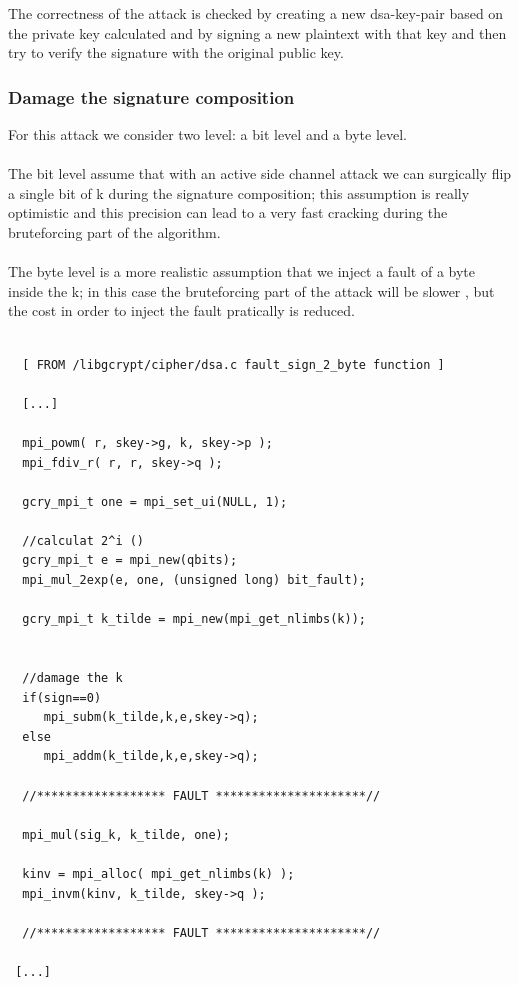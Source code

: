 \documentclass[11pt,english]{article}
\begin{document}
The correctness of the attack is checked by creating a new dsa-key-pair based on the private key calculated and by signing a new plaintext with that key and then try to verify the signature with the original public key.


\subsubsection{Damage the signature composition}

For this attack we consider two level: a bit level and a byte level.\\\\ The bit level assume that with an active side channel attack we can surgically flip a single bit of k during the signature composition; this assumption is really optimistic and this precision can lead to a very fast cracking during the bruteforcing part of the algorithm.\\\\ The byte level is a more realistic assumption that we inject a fault of a byte inside the k; in this case the bruteforcing part of the attack will be slower , but the cost in order to inject the fault pratically is reduced.


\begin{lstlisting}
 
  [ FROM /libgcrypt/cipher/dsa.c fault_sign_2_byte function ]

  [...]
  
  mpi_powm( r, skey->g, k, skey->p );
  mpi_fdiv_r( r, r, skey->q );

  gcry_mpi_t one = mpi_set_ui(NULL, 1); 

  //calculat 2^i ()
  gcry_mpi_t e = mpi_new(qbits);
  mpi_mul_2exp(e, one, (unsigned long) bit_fault);  

  gcry_mpi_t k_tilde = mpi_new(mpi_get_nlimbs(k));
  

  //damage the k
  if(sign==0)
     mpi_subm(k_tilde,k,e,skey->q);  
  else
     mpi_addm(k_tilde,k,e,skey->q);

  //****************** FAULT *********************//
  
  mpi_mul(sig_k, k_tilde, one);
  
  kinv = mpi_alloc( mpi_get_nlimbs(k) );
  mpi_invm(kinv, k_tilde, skey->q );
  
  //****************** FAULT *********************//
  
 [...]

\end{lstlisting}
\end{document}
